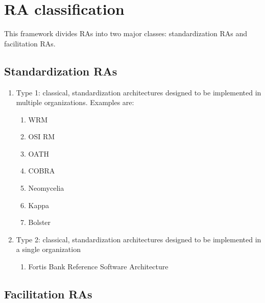 \documentclass{bmcart}
\begin{document}
\section{RA classification} \label{appendixA:RA-classification}

This framework divides RAs into two major classes: standardization RAs and facilitation RAs. 

\subsection{Standardization RAs}

\begin{enumerate}
  \item Type 1: classical, standardization architectures designed to be implemented in multiple organizations. Examples are:

    \begin{enumerate}
  
        \item WRM \cite{hollingsworth1995workflow}
        \item OSI RM \cite{zimmermann1980osi}
        \item OATH \cite{OATH}
        \item COBRA \cite{pope1998corba}
        \item Neomycelia \cite{AtaeiApsec}
        \item Kappa \cite{kreps2014questioning}
        \item Bolster \cite{Nadal}

    \end{enumerate}
 

  \item Type 2: classical, standardization architectures designed to be implemented in a single organization
  
      \begin{enumerate}
          \item Fortis Bank Reference Software Architecture \cite{angelov2009classification}
      \end{enumerate}
\end{enumerate}
    
\subsection{ Facilitation  RAs}
\end{document}
